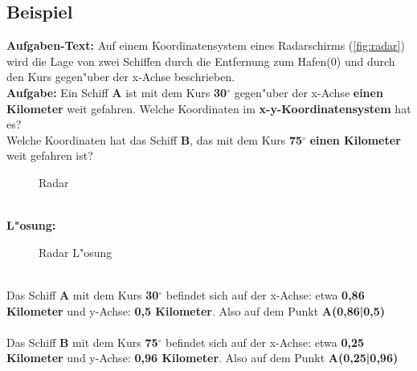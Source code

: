 \documentclass{standalone}
\begin{document}
\subsection{Beispiel}

\textbf{Aufgaben-Text:} Auf einem Koordinatensystem eines Radarschirms (\autoref{fig:radar}) wird die Lage von zwei Schiffen durch die Entfernung zum Hafen(0) und durch den Kurs gegen{"u}ber der x-Achse beschrieben. \\
\textbf{Aufgabe:} Ein Schiff \textbf{A} ist mit dem Kurs \textbf{30$^\circ$} gegen{"u}ber der x-Achse \textbf{einen Kilometer} weit gefahren. Welche Koordinaten im \textbf{x-y-Koordinatensystem} hat es?\\
Welche Koordinaten hat das Schiff \textbf{B}, das mit dem Kurs \textbf{75$^\circ$} \textbf{einen Kilometer} weit gefahren ist?
\begin{figure}[hb!]
	\centering
	\def\svgwidth{250px}
	
	\caption{Radar}
	\label{fig:radar}
\end{figure}
\\
\noindent
\textbf{L{"o}sung:}
\begin{wrapfigure}[9]{r}{0.5\textwidth}
	\def\svgwidth{250px}
	
	\caption{Radar L{"o}sung}
	\label{fig:radar_loesung}
\end{wrapfigure}
\\
Das Schiff \textbf{A} mit dem Kurs \textbf{30$^\circ$} befindet sich auf der x-Achse: etwa \textbf{0,86 Kilometer} und y-Achse: \textbf{0,5 Kilometer}. Also auf dem Punkt \textbf{A(0,86|0,5)} \\  \\
Das Schiff \textbf{B} mit dem Kurs \textbf{75$^\circ$} befindet sich auf der x-Achse: etwa \textbf{0,25 Kilometer} und y-Achse: \textbf{0,96 Kilometer}. Also auf dem Punkt \textbf{A(0,25|0,96)}
\end{document}

